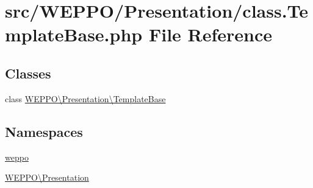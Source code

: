 \hypertarget{class_8TemplateBase_8php}{}\section{src/\+W\+E\+P\+P\+O/\+Presentation/class.Template\+Base.\+php File Reference}
\label{class_8TemplateBase_8php}
\subsection*{Classes}
\begin{DoxyCompactItemize}
\item 
class \hyperlink{classWEPPO_1_1Presentation_1_1TemplateBase}{W\+E\+P\+P\+O\textbackslash{}\+Presentation\textbackslash{}\+Template\+Base}
\end{DoxyCompactItemize}
\subsection*{Namespaces}
\begin{DoxyCompactItemize}
\item 
 \hyperlink{namespaceweppo}{weppo}
\item 
 \hyperlink{namespaceWEPPO_1_1Presentation}{W\+E\+P\+P\+O\textbackslash{}\+Presentation}
\end{DoxyCompactItemize}
